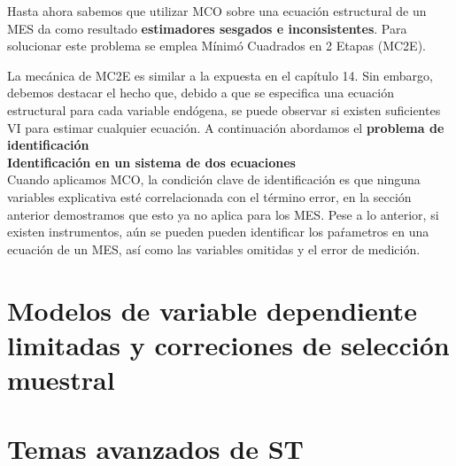 \documentclass[a4paper,11pt]{book}
\begin{document}
Hasta ahora sabemos que utilizar MCO sobre una ecuación estructural de un MES da como resultado  \textbf{estimadores sesgados e inconsistentes}. Para solucionar este problema se emplea Mínimó Cuadrados en 2 Etapas (MC2E).

La mecánica de MC2E es similar a la expuesta en el capítulo 14. Sin embargo, debemos destacar el hecho que, debido a que se especifica una ecuación estructural para cada variable endógena, se puede observar si existen suficientes VI para estimar cualquier ecuación. A continuación abordamos el \textbf{problema de identificación}\\

\textbf{Identificación en un sistema de dos ecuaciones}\\

Cuando aplicamos MCO, la condición clave de identificación es que ninguna variables explicativa esté correlacionada con el término error, en la sección anterior demostramos que esto ya no aplica para los MES. Pese a lo anterior, si existen instrumentos, aún se pueden pueden identificar los paŕametros en una ecuación de un MES, así como las variables omitidas y el error de medición.\\

\chapter{Modelos de variable dependiente limitadas y correciones de selección muestral}
\chapter{Temas avanzados de ST}
\end{document}
